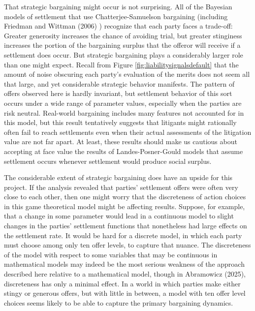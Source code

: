 \documentclass{article}
\begin{document}
That strategic bargaining might occur is not surprising. All of the Bayesian models of settlement that use Chatterjee-Samuelson bargaining (including Friedman and Wittman (2006) \cite{friedmanwittman}) recognize that each party faces a trade-off: Greater generosity increases the chance of avoiding trial, but greater stinginess increases the portion of the bargaining surplus that the offeror will receive if a settlement does occur. But strategic bargaining plays a considerably larger role than one might expect. Recall from Figure \ref{fig:liabilitysignalsdefault} that the amount of noise obscuring each party's evaluation of the merits does not seem all that large, and yet considerable strategic behavior manifests. The pattern of offers observed here is hardly invariant, but settlement behavior of this sort occurs under a wide range of parameter values, especially when the parties are risk neutral. Real-world bargaining includes many features not accounted for in this model, but this result tentatively suggests that litigants might rationally often fail to reach settlements even when their actual assessments of the litigation value are not far apart. At least, these results should make us cautious about accepting at face value the results of Landes-Posner-Gould models that assume settlement occurs whenever settlement would produce social surplus.

The considerable extent of strategic bargaining does have an upside for this project. If the analysis revealed that parties' settlement offers were often very close to each other, then one might worry that the discreteness of action choices in this game theoretical model might be affecting results. Suppose, for example, that a change in some parameter would lead in a continuous model to slight changes in the parties' settlement functions that nonetheless had large effects on the settlement rate. It would be hard for a discrete model, in which each party must choose among only ten offer levels, to capture that nuance. The discreteness of the model with respect to some variables that may be continuous in mathematical models may indeed be the most serious weakness of the approach described here relative to a mathematical model, though in Abramowicz (2025), discreteness has only a minimal effect. In a world in which parties make either stingy or generous offers, but with little in between, a model with ten offer level choices seems likely to be able to capture the primary bargaining dynamics. 
\end{document}
